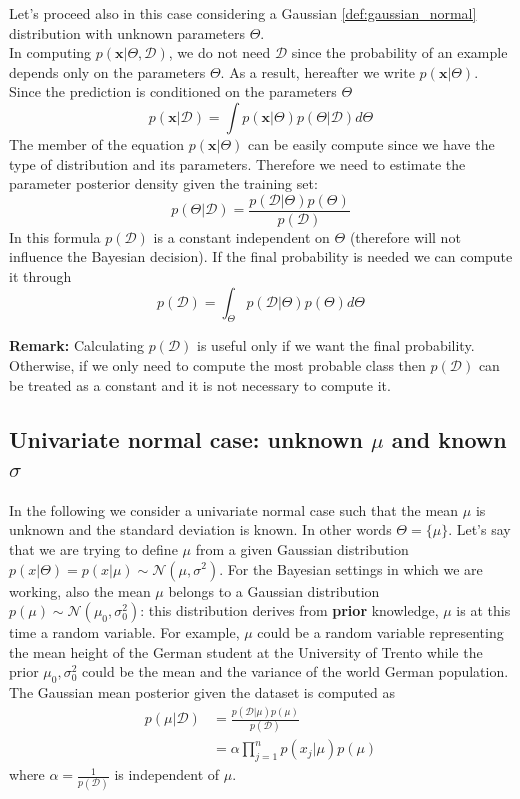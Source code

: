     Let's proceed also in this case considering a Gaussian \ref{def:gaussian_normal} distribution with unknown parameters $\Theta$.\\
    In computing $p(\pmb{x} | \Theta, \mathcal{D})$, we do not need $\mathcal{D}$ since the probability of an example depends only on the parameters $\Theta$. As a result, hereafter we write $p(\pmb{x}|\Theta)$.
    Since the prediction is conditioned on the parameters $\Theta$
    $$p(\pmb{x}|\mathcal{D}) = \int p(\pmb{x}|\Theta)p(\Theta|\mathcal{D})d\Theta$$
    The member of the equation $p(\pmb{x}|\Theta)$ can be easily compute since we have the type of distribution and its parameters.
    Therefore we need to estimate the parameter posterior density given the training set:
    $$p(\Theta|\mathcal{D}) = \frac{p(\mathcal{D}|\Theta)p(\Theta)}{p(\mathcal{D})}$$
    In this formula $p(\mathcal{D})$ is a constant independent on $\Theta$ (therefore will not influence the Bayesian decision).
    If the final probability is needed we can compute it through
    $$p(\mathcal{D}) = \int_{\Theta} p(\mathcal{D}|\Theta)p(\Theta)d\Theta$$
    
    \textbf{Remark:} Calculating $p(\mathcal{D})$ is useful only if we want the final probability. Otherwise, if we only need to compute the most probable class then $p(\mathcal{D})$ can be treated as a constant and it is not necessary to compute it.
    
    \subsection{Univariate normal case: unknown \texorpdfstring{$\mu$}{u} and known \texorpdfstring{$\sigma$}{s}}
    In the following we consider a univariate normal case such that the mean $\mu$ is unknown and the standard deviation is known. In other words $\Theta = \{ \mu \}$.
    Let's say that we are trying to define $\mu$ from a given Gaussian distribution $p(x|\Theta) = p(x|\mu) \sim \mathcal{N}(\mu, \sigma^2)$.
    For the Bayesian settings in which we are working, also the mean $\mu$ belongs to a Gaussian distribution $p(\mu) \sim \mathcal{N}(\mu_0, \sigma_{0}^2)$: this distribution derives from \textbf{prior} knowledge, $\mu$ is at this time a random variable. For example, $\mu$ could be a random variable representing the mean height of the German student at the University of Trento while the prior $\mu_0, \sigma^2_0$ could be the mean and the variance of the world German population.\\
    The Gaussian mean posterior given the dataset is computed as
    \begin{align*}
    p(\mu|\mathcal{D}) &= \frac{p(\mathcal{D}|\mu)p(\mu)}{p(\mathcal{D})}\\
    &= \alpha \prod_{j=1}^n p(x_j|\mu)p(\mu)
    \end{align*}
    where $\alpha = \frac{1}{p(\mathcal{D})}$ is independent of $\mu$.\\
    
